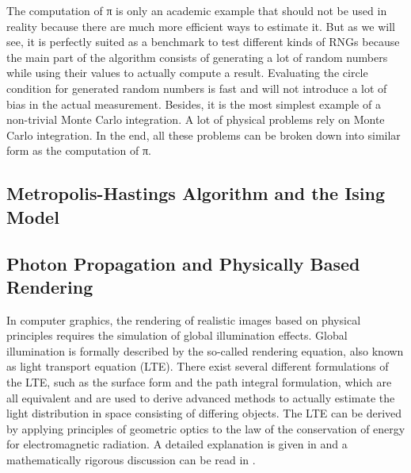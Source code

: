 \documentclass{stdlocal}
\begin{document}

    The computation of π is only an academic example that should not be used in reality because there are much more efficient ways to estimate it.
    But as we will see, it is perfectly suited as a benchmark to test different kinds of RNGs because the main part of the algorithm consists of generating a lot of random numbers while using their values to actually compute a result.
    Evaluating the circle condition for generated random numbers is fast and will not introduce a lot of bias in the actual measurement.
    Besides, it is the most simplest example of a non-trivial Monte Carlo integration.
    A lot of physical problems rely on Monte Carlo integration.
    In the end, all these problems can be broken down into similar form as the computation of π.

  \subsection{Metropolis-Hastings Algorithm and the Ising Model} %
  \label{sub:metropolis_hastings_algorithm_and_the_ising_model}


  \subsection{Photon Propagation and Physically Based Rendering} %
  \label{sub:photon_propagation_and_physically_based_rendering}
    In computer graphics, the rendering of realistic images based on physical principles requires the simulation of global illumination effects.
    Global illumination is formally described by the so-called rendering equation, also known as light transport equation (LTE).
    There exist several different formulations of the LTE, such as the surface form and the path integral formulation, which are all equivalent and are used to derive advanced methods to actually estimate the light distribution in space consisting of differing objects.
    The LTE can be derived by applying principles of geometric optics to the law of the conservation of energy for electromagnetic radiation.
    A detailed explanation is given in \textcite{pharr2016} and a mathematically rigorous discussion can be read in \textcite{pawellek2017}.
\end{document}
